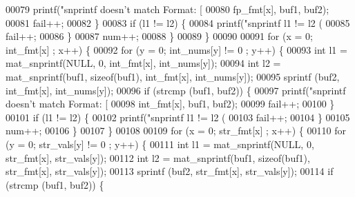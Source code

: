 \begin{DoxyCode}
{{{{{{{{{{{{{{{{{{{{{{{{{{{{00079                                 printf(\textcolor{stringliteral}{"snprintf doesn't match Format: %
       [%
00080                                        fp\_fmt[x], buf1, buf2);
00081                                 fail++;
00082                         \}
00083                         \textcolor{keywordflow}{if} (l1 != l2) \{
00084                                 printf(\textcolor{stringliteral}{"snprintf l1 != l2 (%
00085                                 fail++;
00086                         \}
00087                         num++;
00088                 \}
00089         \}
00090 
00091         \textcolor{keywordflow}{for} (x = 0; int\_fmt[x] ; x++) \{
00092                 \textcolor{keywordflow}{for} (y = 0; int\_nums[y] != 0 ; y++) \{
00093                         \textcolor{keywordtype}{int} l1 = mat\_snprintf(NULL, 0, int\_fmt[x], int\_nums[y]);
00094                         \textcolor{keywordtype}{int} l2 = mat\_snprintf(buf1, \textcolor{keyword}{sizeof}(buf1), int\_fmt[x], int\_nums[y]);
00095                         sprintf (buf2, int\_fmt[x], int\_nums[y]);
00096                         \textcolor{keywordflow}{if} (strcmp (buf1, buf2)) \{
00097                                 printf(\textcolor{stringliteral}{"snprintf doesn't match Format: %
       [%
00098                                        int\_fmt[x], buf1, buf2);
00099                                 fail++;
00100                         \}
00101                         \textcolor{keywordflow}{if} (l1 != l2) \{
00102                                 printf(\textcolor{stringliteral}{"snprintf l1 != l2 (%
00103                                 fail++;
00104                         \}
00105                         num++;
00106                 \}
00107         \}
00108 
00109         \textcolor{keywordflow}{for} (x = 0; str\_fmt[x] ; x++) \{
00110                 \textcolor{keywordflow}{for} (y = 0; str\_vals[y] != 0 ; y++) \{
00111                         \textcolor{keywordtype}{int} l1 = mat\_snprintf(NULL, 0, str\_fmt[x], str\_vals[y]);
00112                         \textcolor{keywordtype}{int} l2 = mat\_snprintf(buf1, \textcolor{keyword}{sizeof}(buf1), str\_fmt[x], str\_vals[y]);
00113                         sprintf (buf2, str\_fmt[x], str\_vals[y]);
00114                         \textcolor{keywordflow}{if} (strcmp (buf1, buf2)) \{
}}}}}}}}}}}}}}}}}}}}}}}}}}}}}}}}
\end{DoxyCode}

